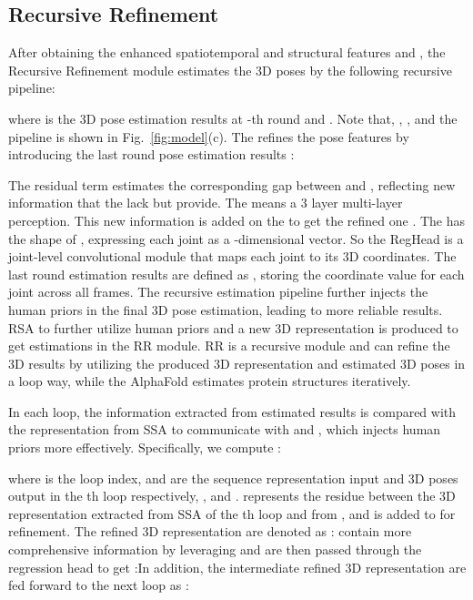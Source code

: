 \documentclass{article}
\begin{document}
\fi

\subsection{Recursive Refinement}\vspace{-0.2em}




After obtaining the enhanced spatiotemporal and structural features  and , the Recursive Refinement module estimates the 3D poses by the following recursive pipeline:

where  is the 3D pose estimation results at -th round and . Note that, , , and the pipeline is shown in Fig.~\ref{fig:model}(c). The  refines the pose features  by introducing the last round pose estimation results :

The residual term estimates the corresponding gap between  and , reflecting new information that the  lack but  provide. The  means a 3 layer multi-layer perception.  This new information is added on the  to get the refined one . The  has the shape of , expressing each joint as a -dimensional vector. So the RegHead is a joint-level convolutional module that maps each joint to its 3D coordinates. The last round estimation results are defined as , storing the  coordinate value for each joint across all frames. The recursive estimation pipeline further injects the human priors in the final 3D pose estimation, leading to more reliable results. 
\iffalse
RSA to further utilize human priors and a new 3D representation is produced to get estimations  in the RR module. RR is a recursive module and can refine the 3D results by utilizing the produced 3D representation and estimated 3D poses in a loop way, while the AlphaFold estimates protein structures iteratively.

In each loop, the information extracted from estimated results is compared with the representation from SSA to communicate with  and , which injects human priors more effectively. Specifically, we compute :

where  is the loop index, 
 and  are the sequence representation input and 3D poses output in the th loop respectively, , and .  represents  
the residue between the 3D representation extracted from SSA of the th loop and from , 
and is added to  for refinement. The refined 3D representation are denoted as :
 contain more comprehensive information by leveraging  and are then passed through the regression head to get :In addition, the intermediate refined 3D representation  are fed forward to the next loop as :
\end{document}
